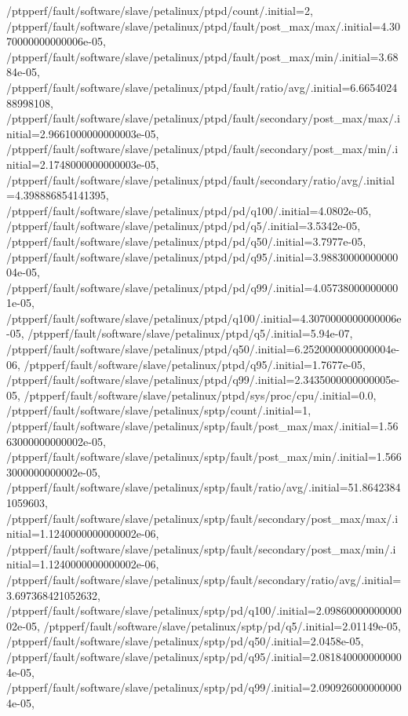 {    /ptpperf/fault/software/slave/petalinux/ptpd/count/.initial=2,
    /ptpperf/fault/software/slave/petalinux/ptpd/fault/post_max/max/.initial=4.3070000000000006e-05,
    /ptpperf/fault/software/slave/petalinux/ptpd/fault/post_max/min/.initial=3.6884e-05,
    /ptpperf/fault/software/slave/petalinux/ptpd/fault/ratio/avg/.initial=6.665402488998108,
    /ptpperf/fault/software/slave/petalinux/ptpd/fault/secondary/post_max/max/.initial=2.9661000000000003e-05,
    /ptpperf/fault/software/slave/petalinux/ptpd/fault/secondary/post_max/min/.initial=2.1748000000000003e-05,
    /ptpperf/fault/software/slave/petalinux/ptpd/fault/secondary/ratio/avg/.initial=4.398886854141395,
    /ptpperf/fault/software/slave/petalinux/ptpd/pd/q100/.initial=4.0802e-05,
    /ptpperf/fault/software/slave/petalinux/ptpd/pd/q5/.initial=3.5342e-05,
    /ptpperf/fault/software/slave/petalinux/ptpd/pd/q50/.initial=3.7977e-05,
    /ptpperf/fault/software/slave/petalinux/ptpd/pd/q95/.initial=3.9883000000000004e-05,
    /ptpperf/fault/software/slave/petalinux/ptpd/pd/q99/.initial=4.057380000000001e-05,
    /ptpperf/fault/software/slave/petalinux/ptpd/q100/.initial=4.3070000000000006e-05,
    /ptpperf/fault/software/slave/petalinux/ptpd/q5/.initial=5.94e-07,
    /ptpperf/fault/software/slave/petalinux/ptpd/q50/.initial=6.2520000000000004e-06,
    /ptpperf/fault/software/slave/petalinux/ptpd/q95/.initial=1.7677e-05,
    /ptpperf/fault/software/slave/petalinux/ptpd/q99/.initial=2.3435000000000005e-05,
    /ptpperf/fault/software/slave/petalinux/ptpd/sys/proc/cpu/.initial=0.0,
    /ptpperf/fault/software/slave/petalinux/sptp/count/.initial=1,
    /ptpperf/fault/software/slave/petalinux/sptp/fault/post_max/max/.initial=1.5663000000000002e-05,
    /ptpperf/fault/software/slave/petalinux/sptp/fault/post_max/min/.initial=1.5663000000000002e-05,
    /ptpperf/fault/software/slave/petalinux/sptp/fault/ratio/avg/.initial=51.86423841059603,
    /ptpperf/fault/software/slave/petalinux/sptp/fault/secondary/post_max/max/.initial=1.1240000000000002e-06,
    /ptpperf/fault/software/slave/petalinux/sptp/fault/secondary/post_max/min/.initial=1.1240000000000002e-06,
    /ptpperf/fault/software/slave/petalinux/sptp/fault/secondary/ratio/avg/.initial=3.697368421052632,
    /ptpperf/fault/software/slave/petalinux/sptp/pd/q100/.initial=2.0986000000000002e-05,
    /ptpperf/fault/software/slave/petalinux/sptp/pd/q5/.initial=2.01149e-05,
    /ptpperf/fault/software/slave/petalinux/sptp/pd/q50/.initial=2.0458e-05,
    /ptpperf/fault/software/slave/petalinux/sptp/pd/q95/.initial=2.0818400000000004e-05,
    /ptpperf/fault/software/slave/petalinux/sptp/pd/q99/.initial=2.0909260000000004e-05,
}
